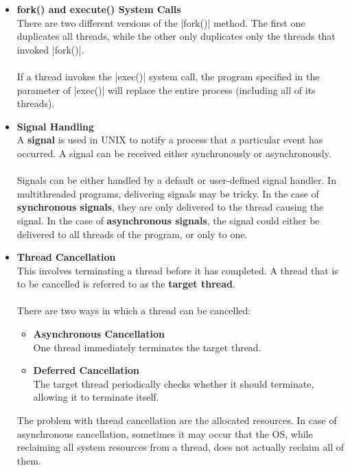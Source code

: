 \documentclass{article}
\begin{document}
\begin{itemize}
	\item \textbf{fork() and execute() System Calls}
	\vspace{.2cm} \\
	There are two different versions of the \cverb|fork()| method. The first one duplicates all threads, while the other only duplicates only the threads that invoked \cverb|fork()|. \\ \\
	If a thread invokes the \cverb|exec()| system call, the program specified in the parameter of \cverb|exec()| will replace the entire process (including all of its threads).
	
	\item \textbf{Signal Handling}
	\vspace{.2cm} \\
	A \textbf{signal} is used in UNIX to notify a process that a particular event has occurred. A signal can be received either synchronously or asynchronously. \\ \\
	Signals can be either handled  by a default or user-defined signal handler. In multithreaded programs, delivering signals may be tricky. In the case of \textbf{synchronous signals}, they are only delivered to the thread causing the signal. In the case of \textbf{asynchronous signals}, the signal could either be delivered to all threads of the program, or only to one.
	
	\item \textbf{Thread Cancellation}
	\vspace{.2cm} \\
	This involves terminating a thread before it has completed. A thread that is to be cancelled is referred to as the \textbf{target thread}. \\ \\
	There are two ways in which a thread can be cancelled:
	
	\begin{itemize}
		\item \textbf{Asynchronous Cancellation}
		\vspace{.2cm} \\
		One thread immediately terminates the target thread.
		
		\item \textbf{Deferred Cancellation}
		\vspace{.2cm} \\
		The target thread periodically checks whether it should terminate, allowing it to terminate itself.
	\end{itemize}
	The problem with thread cancellation are the allocated resources. In case of asynchronous cancellation, sometimes it may occur that the OS, while reclaiming all system resources from a thread, does not actually reclaim all of them.
\end{itemize}
\end{document}
